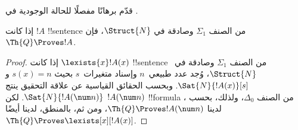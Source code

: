 \documentclass[../../../include/open-logic-section]{subfiles}
\begin{document}
\begin{prob}
قدّم برهانًا مفصلًا للحالة الوجودية في
.
\end{prob}

\begin{thm}
إذا كانت $!A$ !!{sentence} من الصنف $\Sigma_1$ وصادقة في
$\Struct{N}$، فإن $\Th{Q}\Proves !A$.
\end{thm}

\begin{proof}
إذا كانت $\lexists{x}!A(x)$ !!{sentence} من الصنف $\Sigma_1$
وصادقة في~$\Struct{N}$، وُجد عدد طبيعي~$n$ وإسناد متغيرات~$s$ بحيث
$s(x)=n$ و$\Sat{N}{!A(x)}[s]$. وبحسب الحقائق القياسية عن علاقة
التحقيق ينتج $\Sat{N}{!A(\num n)}$. لكن $!A(\num n)$
!!{formula} من الصنف $\Delta_0$، ولذلك، بحسب
، لدينا
$\Th{Q}\Proves !A(\num n)$، ومن ثم، بالمنطق، لدينا أيضًا
$\Th{Q}\Proves\lexists[x][!A(x)]$.
\end{proof}
\end{document}
